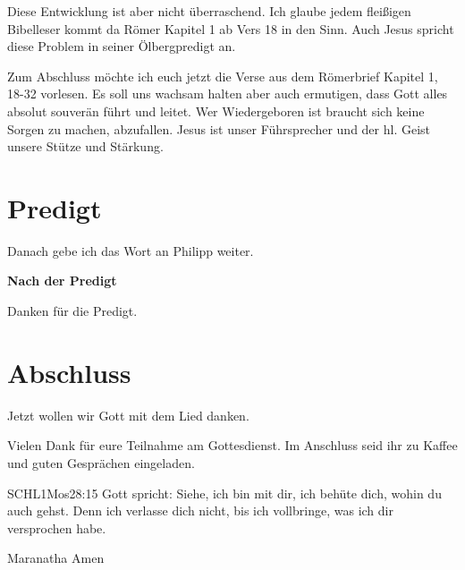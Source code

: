 \documentclass{../../inc/mybib}
\begin{document}
\begin{spacing}{1.5}
Diese Entwicklung ist aber nicht überraschend. Ich glaube jedem fleißigen Bibelleser kommt da Römer Kapitel 1 ab Vers 18 in den Sinn. Auch Jesus spricht diese Problem in seiner Ölbergpredigt an.

Zum Abschluss möchte ich euch jetzt die Verse aus dem Römerbrief Kapitel 1, 18-32 vorlesen. Es soll uns wachsam halten aber auch ermutigen, dass Gott alles absolut souverän führt und leitet. Wer Wiedergeboren ist braucht sich keine Sorgen zu machen, abzufallen. Jesus ist unser Führsprecher und der hl. Geist unsere Stütze und Stärkung.
\end{spacing}

\newpage
\section{Predigt}

Danach gebe ich das Wort an Philipp weiter.

\textbf{Nach der Predigt}

Danken für die Predigt.






\section{Abschluss}

Jetzt wollen wir Gott mit dem Lied  danken.

Vielen Dank für eure Teilnahme am Gottesdienst. Im Anschluss seid ihr zu Kaffee und guten Gesprächen eingeladen.
\beten{}

\begin{bibelbox}{SCHL}{1Mos}{28:15}
Gott spricht: Siehe, ich bin mit dir,
ich behüte dich, wohin du auch gehst.
Denn ich verlasse dich nicht,
bis ich vollbringe, was ich dir versprochen habe.
\end{bibelbox}

Maranatha Amen
\end{document}
